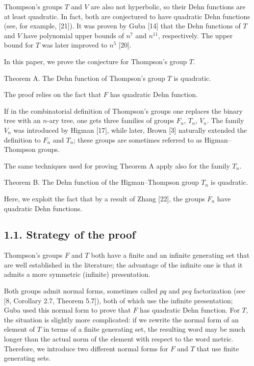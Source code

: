 Thompson's groups $T$ and $V$ are also not hyperbolic, so their Dehn functions are at least quadratic. In fact, both are conjectured to have quadratic Dehn functions (see, for example, [21]). It was proven by Guba [14] that the Dehn functions of $T$ and $V$ have polynomial upper bounds of $n^7$ and $n^{11}$, respectively. The upper bound for $T$ was later improved to $n^5$ [20].

In this paper, we prove the conjecture for Thompson's group $T$.

\begin{authorstatement}{Theorem A.}
The Dehn function of Thompson's group $T$ is quadratic.
\end{authorstatement}
The proof relies on the fact that $F$ has quadratic Dehn function.

If in the combinatorial definition of Thompson's groups one replaces the binary tree with an $n$-ary tree, one gets three families of groups $F_n$, $T_n$, $V_n$. The family $V_n$ was introduced by Higman [17], while later, Brown [3] naturally extended the definition to $F_n$ and $T_n$; these groups are sometimes referred to as Higman--Thompson groups.

The same techniques used for proving Theorem A apply also for the family $T_n$.
\begin{authorstatement}{Theorem B.}
The Dehn function of the Higman--Thompson group $T_n$ is quadratic.
\end{authorstatement}
Here, we exploit the fact that by a result of Zhang [22], the groups $F_n$ have quadratic Dehn functions.

\subsection*{1.1. Strategy of the proof}
Thompson's groups $F$ and $T$ both have a finite and an infinite generating set that are well established in the literature; the advantage of the infinite one is that it admits a more symmetric (infinite) presentation.

Both groups admit normal forms, sometimes called $pq$ and $pcq$ factorization (see [8, Corollary 2.7, Theorem 5.7]), both of which use the infinite presentation; Guba used this normal form to prove that $F$ has quadratic Dehn function. For $T$, the situation is slightly more complicated: if we rewrite the normal form of an element of $T$ in terms of a finite generating set, the resulting word may be much longer than the actual norm of the element with respect to the word metric. Therefore, we introduce two different normal forms for $F$ and $T$ that use finite generating sets.

